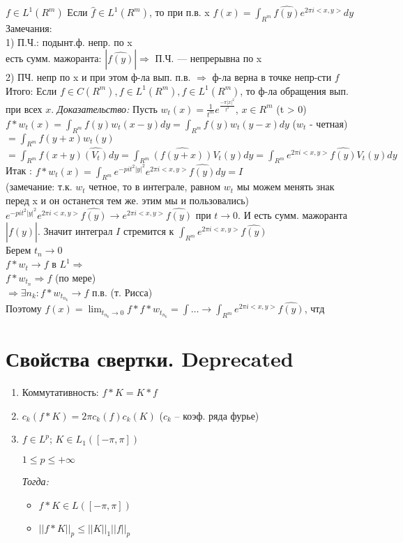\documentclass[paper=a4, fontsize=17pt]{article}
\begin{document}
$f \in L^1(R^m)$
Если $\hat{f} \in L^1(R^m)$, то при п.в. x $f(x) = \int_{R^m} \hat{f(y)} e^{2\pi i <x, y>} dy$ \\
Замечания: \\
1) П.Ч.: подынт.ф. непр. по x \\
есть сумм. мажоранта: $|\hat{f(y)}| \Rightarrow $ П.Ч. --- непрерывна по x \\
2) ПЧ. непр по x и при этом ф-ла вып. п.в. $\Rightarrow$ ф-ла верна в точке непр-сти $f$ \\
Итого: Если $f \in C(R^m), f \in L^1(R^m), \hat{f} \in L^1(R^m)$, то ф-ла обращения вып. при всех $x$.
\emph{Доказательство:}
Пусть $w_t(x) = \frac{1}{t^m} e^{\frac{-\pi |x|^2}{t^2}}$, $x \in R^m$ (t > 0) \\
$f * w_t(x) = \int_{R^m} f(y) w_t(x-y) dy = \int_{R^m} f(y)w_t(y-x)dy$ ($w_t$ - четная) $ = \int_{R^m}f(y+x)w_t(y)$
$= \int_{R^m} f(x+y) \hat{(V_t)} dy = \int_{R^m} \hat{(f(y+x))} V_t(y) dy = \int_{R^m} e^{2 \pi i <x, y>} \hat{f(y)} V_t(y) dy$\\
Итак : $f * w_t(x) = \int_{R^m} e^{-pi t^2 |y|^2} e^{2 \pi i <x, y>} \hat{f(y)} dy = I$ \\
(замечание: т.к. $w_t$ четное, то в интеграле, равном $w_t$ мы можем менять знак перед x и он останется тем же. этим мы и пользовались) \\
$e^{-pi t^2 |y|^2} e^{2 \pi i <x, y>} \hat{f(y)}  \rightarrow e^{2 \pi i <x, y>} \hat{f(y)}$ при $t \rightarrow 0$. И есть сумм. мажоранта $|\hat{f(y)}|$. Значит интеграл $I$ стремится к $\int_{R^m} e^{2 \pi i <x, y>} \hat{f(y)}$\\
Берем $t_n \rightarrow 0$\\
$f*w_t \rightarrow f$ в $L^1 \Rightarrow $\\
$f*w_{t_n} \Rightarrow f$ (по мере)\\
$\Rightarrow \exists n_k : f*w_{t_{n_k}} \rightarrow f$ п.в. (т. Рисса) \\
Поэтому $f(x) = \lim_{t_{n_k} \rightarrow 0} f*f*w_{t_{n_k}} = \int \dots \rightarrow \int_{R^m} e^{2 \pi i <x, y>} \hat{f(y)}$, чтд


\section{Свойства свертки.  \Large Deprecated}

\begin{enumerate}
	\item Коммутативность: $ f \ast K = K \ast f$
	\item $ c_k(f \ast K) = 2\pi c_k(f) c_k(K) $ ($ c_k $ -- коэф. ряда фурье)
	\item
		$ f \in L^p $; $ K \in L_1( [-\pi, \pi]) $

		$ 1 \leqslant p \leqslant +\infty $

		\emph{Тогда:}
		\begin{itemize}
			\item $ f \ast K \in L([-\pi, \pi]) $
			\item $ ||f \ast K||_{p} \leqslant ||K||_1 ||f||_p $
		\end{itemize}
\end{enumerate}
\end{document}

